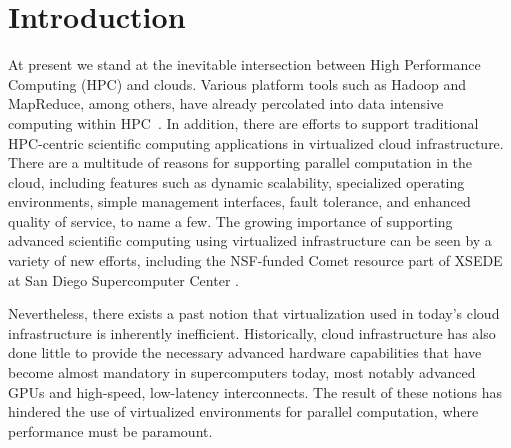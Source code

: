 

\section{Introduction}

At present we stand at the inevitable intersection between High Performance Computing (HPC) and clouds. Various platform tools such as Hadoop and MapReduce, among others, have already percolated into data intensive computing within HPC~\cite{Jha2014apache}.  In addition, there are efforts to support traditional HPC-centric scientific computing applications in virtualized cloud infrastructure.  There are a multitude of reasons for supporting parallel computation in the cloud\cite{Armbrust2010}, including features such as dynamic scalability, specialized operating environments, simple management interfaces, fault tolerance, and enhanced quality of service, to name a few. The growing importance of supporting advanced scientific computing using virtualized infrastructure can be seen by a variety of new efforts, including the NSF-funded Comet resource part of XSEDE at San Diego Supercomputer Center \cite{moore2014gateways}.  

Nevertheless, there exists a past notion that virtualization used in today's cloud infrastructure is inherently inefficient.  Historically, cloud infrastructure has also done little to provide the necessary advanced hardware capabilities that have become almost mandatory in supercomputers today, most notably advanced GPUs and high-speed, low-latency interconnects.  The result of these notions has hindered the use of virtualized environments for parallel computation, where performance must be paramount.


